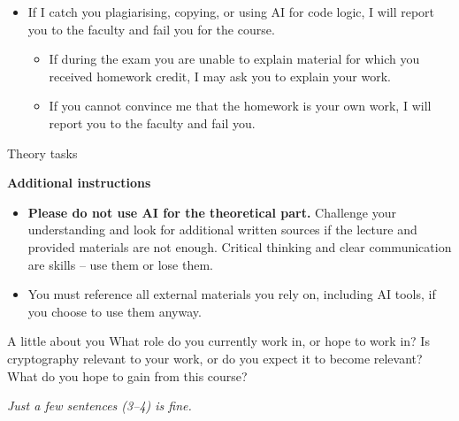 \documentclass{homework}
\begin{document}
\begin{itemize}
\begin{itemize}
    \item Not acceptable: e.g. generating code logic, library use, or crypto operations.
    \item If you use AI in any form, including for rewording, state in your report where and what you used it for.
    \item I recommend asking in the server or contacting me instead of using AI.
  \end{itemize}
  \item If I catch you plagiarising, copying, or using AI for code logic, I will report you to the faculty and fail you for the course.
  \begin{itemize}
    \item If during the exam you are unable to explain material for which you received homework credit, I may ask you to explain your work.
    \item If you cannot convince me that the homework is your own work, I will report you to the faculty and fail you.
  \end{itemize}
\end{itemize}

\newpage

\begin{center}
  Theory tasks
\end{center}

\textbf{Additional instructions}

\begin{itemize}
  \item \textbf{Please do not use AI for the theoretical part.}
  Challenge your understanding and look for additional written sources if the lecture and provided materials are not enough.
  Critical thinking and clear communication are skills -- use them or lose them.
  \item You must reference all external materials you rely on, including AI tools, if you choose to use them anyway.
\end{itemize}

\begin{task}{A little about you}
  What role do you currently work in, or hope to work in?
  Is cryptography relevant to your work, or do you expect it to become relevant?
  What do you hope to gain from this course?

  \textit{Just a few sentences (3--4) is fine.}
\end{task}
\end{document}
